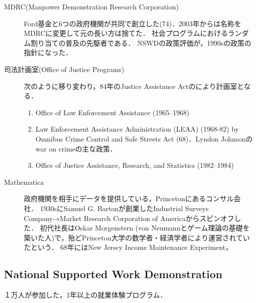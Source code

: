 \documentclass[uplatex,dvipdfmx]{jsreport}
\begin{document}
\begin{example}\mbox{}
    \begin{description}
        \item[MDRC(Manpower Demonstration Research Corporation)] Ford基金と6つの政府機関が共同で創立した(74)．2003年からは名称をMDRCに変更して元の長い方は捨てた．
        社会プログラムにおけるランダム割り当ての普及の先駆者である．
        NSWDの政策評価が，1990sの政策の指針になった．
        \item[司法計画室(Office of Justice Programs)] 次のように移り変わり，84年のJustice Assistance Actのにより計画室となる．
        \begin{enumerate}
            \item Office of Law Enforcement Assistance (1965–1968)
            \item Law Enforcement Assistance Administration (LEAA) (1968-82) by Omnibus Crime Control and Safe Streets Act (68)．Lyndon Johnsonのwar on crimeの主な政策．
            \item Office of Justice Assistance, Research, and Statistics (1982–1984)
        \end{enumerate}
        \item[Mathematica] 政府機関を相手にデータを提供している，Princetonにあるコンサル会社．
        1930sにSamuel G. Bartonが創業したIndustrial Surveys Company→Market Research Corporation of Americaからスピンオフした．
        初代社長はOskar Morgenstern (von Neumannとゲーム理論の基礎を築いた人)で，殆どPrinceton大学の数学者・経済学者により運営されていたという．
        68年にはNew Jersey Income Maintenance Experiment，
    \end{description}
\end{example}

\subsection{National Supported Work Demonstration}

\begin{tcolorbox}[colframe=ForestGreen, colback=ForestGreen!10!white,breakable,colbacktitle=ForestGreen!40!white,coltitle=black,fonttitle=\bfseries\sffamily,
title=]
    １万人が参加した，1年以上の就業体験プログラム．
\end{tcolorbox}
\end{document}
